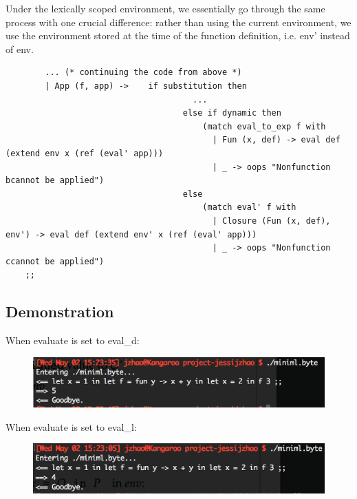 \documentclass[submit]{harvardml}
\begin{document}
\begin{itemize}
	Under the lexically scoped environment, we essentially go through the same process with one crucial difference: rather than using the current environment, we use the environment stored at the time of the function definition, i.e. env' instead of env.

	\begin{lstlisting}
		... (* continuing the code from above *)
		| App (f, app) ->    if substitution then
									  ...
									else if dynamic then
										(match eval_to_exp f with
										  | Fun (x, def) -> eval def (extend env x (ref (eval' app)))
										  | _ -> oops "Nonfunction bcannot be applied")
									else
										(match eval' f with
										  | Closure (Fun (x, def), env') -> eval def (extend env' x (ref (eval' app)))
										  | _ -> oops "Nonfunction ccannot be applied")
    ;;
	\end{lstlisting}
\end{itemize}

\subsection*{Demonstration}
When evaluate is set to eval\_d:
\begin{figure}[H]
	\centering
	\includegraphics[width=300 pt]{dynamic}
\end{figure}

When evaluate is set to eval\_l:
\begin{figure}[H]
	\centering
	\includegraphics[width=300 pt]{lexical}
\end{figure}
\end{document}

